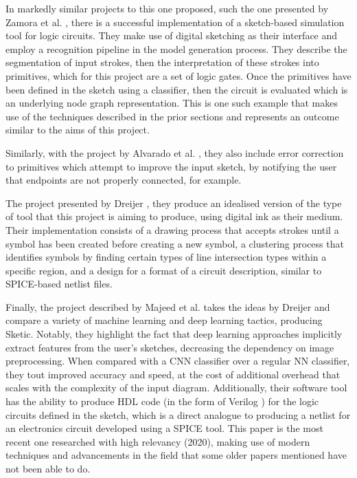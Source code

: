 \documentclass{article}
\begin{document}
In markedly similar projects to this one proposed, such the one presented by Zamora et al. \cite{20090001}, there is a successful implementation 
of a sketch-based simulation tool for logic circuits. They make use of digital sketching as their interface and employ a recognition
pipeline in the model generation process. They describe the segmentation of input strokes, then the interpretation of these strokes
into primitives, which for this project are a set of logic gates. Once the primitives have been defined in the sketch using a classifier,
then the circuit is evaluated which is an underlying node graph representation. This is one such example that makes use of the techniques
described in the prior sections and represents an outcome similar to the aims of this project.

Similarly, with the project by Alvarado et al. \cite{9155937}, they also include error correction to primitives which attempt to improve
the input sketch, by notifying the user that endpoints are not properly connected, for example. 

The project presented by Dreijer \cite{dreijer}, they produce an idealised version of the type of tool that this project
is aiming to produce, using digital ink as their medium. Their implementation consists of a drawing process that accepts strokes 
until a symbol has been created before creating a new symbol, a clustering process that identifies symbols by finding certain types 
of line intersection types within a specific region, and a design for a format of a circuit description, similar to \gls{SPICE}-based
netlist files. 

Finally, the project described by Majeed et al. \cite{191016} takes the ideas by Dreijer and compare a variety of machine learning and deep 
learning tactics, producing Sketic. Notably, they highlight the fact that deep learning approaches implicitly extract features from the user's 
sketches, decreasing the dependency on image preprocessing. When compared with a \gls{CNN} classifier over a regular \gls{NN} classifier, they
tout improved accuracy and speed, at the cost of additional overhead that scales with the complexity of the input diagram. Additionally, 
their software tool has the ability to produce \gls{HDL} code (in the form of Verilog \cite{8299595}) for the logic circuits defined in the sketch, which is a direct analogue to 
producing a netlist for an electronics circuit developed using a \gls{SPICE} tool. This paper is the most recent
one researched with high relevancy (2020), making use of modern techniques and advancements in the field that some older papers mentioned have not been able to do.
\end{document}
